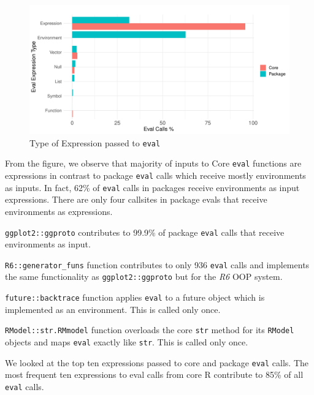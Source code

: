 \documentclass[a4paper,USenglish,cleveref, autoref, thm-restate]{lipics-v2019}
\newcommand{\PackageEnvironmentInputEvalCallPerc}{62\%\xspace}
\newcommand{\eval}{\texttt{eval}\xspace}
\renewcommand{\c}[1]{\lstinline{#1}\xspace}
\begin{document}
\begin{figure}[!h]
  \centering
  \includegraphics[width=\columnwidth]{eval-expression-kind}
  \caption{Type of Expression passed to \eval} \label{fig:eval-expression-kind}
\end{figure}

From the figure, we observe that majority of inputs to Core \eval functions
are expressions in contrast to package \eval calls which receive mostly
environments as inputs. In fact, \PackageEnvironmentInputEvalCallPerc of
\eval calls in packages receive environments as input expressions. There are
only four callsites in package evals that receive environments as
expressions.
\begin{compactitem}[$-$]
\item \c{ggplot2::ggproto} contributes to 99.9\% of package \eval calls that
  receive environments as input.
\item \c{R6::generator_funs} function contributes to only 936 \eval calls and
implements the same functionality as \c{ggplot2::ggproto} but for the \emph{R6}
OOP system.
\item \c{future::backtrace} function applies \eval to a future object which
  is implemented as an environment. This is called only once.
\item \c{RModel::str.RMmodel} function overloads the core \c{str} method for its
\c{RModel} objects and maps \eval exactly like \c{str}. This is called only
once.
\end{compactitem}

We looked at the top ten expressions passed to core and package \eval
calls. The most frequent ten expressions to eval calls from core R
contribute to 85\% of all \eval calls.
\end{document}
